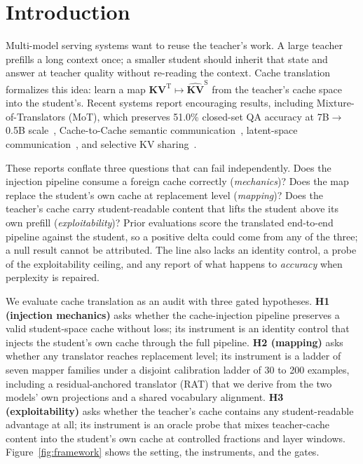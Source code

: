 \documentclass[10pt]{article}
\begin{document}
\section{Introduction}
\label{sec:intro}

Multi-model serving systems want to reuse the teacher's work. A large teacher
prefills a long context once; a smaller student should inherit that state and
answer at teacher quality without re-reading the context. Cache translation
formalizes this idea: learn a map $\mathbf{KV}^{\mathrm{T}} \mapsto
\widehat{\mathbf{KV}}^{\mathrm{S}}$ from the teacher's cache space into the
student's. Recent systems report encouraging results, including
Mixture-of-Translators (MoT), which preserves 51.0\% closed-set QA accuracy at
7B$\to$0.5B scale~\citep{mot2026}, Cache-to-Cache semantic
communication~\citep{c2c2025}, latent-space
communication~\citep{lsc2026}, and selective KV
sharing~\citep{kvcomm2025}.

These reports conflate three questions that can fail independently. Does the
injection pipeline consume a foreign cache correctly (\emph{mechanics})? Does
the map replace the student's own cache at replacement level (\emph{mapping})?
Does the teacher's cache carry student-readable content that lifts the student
above its own prefill (\emph{exploitability})? Prior evaluations score the
translated end-to-end pipeline against the student, so a positive delta could
come from any of the three; a null result cannot be attributed. The line also
lacks an identity control, a probe of the exploitability ceiling, and any
report of what happens to \emph{accuracy} when perplexity is repaired.

We evaluate cache translation as an audit with three gated hypotheses.
\textbf{H1 (injection mechanics)} asks whether the cache-injection pipeline preserves a valid
student-space cache without loss;
its instrument is an identity control that injects the student's own cache
through the full pipeline. \textbf{H2 (mapping)} asks whether any translator
reaches replacement level; its instrument is a ladder of seven mapper families
under a disjoint calibration ladder of 30 to 200 examples, including a
residual-anchored translator (RAT) that we derive from the two models' own
projections and a shared vocabulary alignment. \textbf{H3 (exploitability)}
asks whether the teacher's cache contains any student-readable advantage at
all; its instrument is an oracle probe that mixes teacher-cache content into
the student's own cache at controlled fractions and layer windows. Figure~\ref{fig:framework}
shows the setting, the instruments, and the gates.
\end{document}

